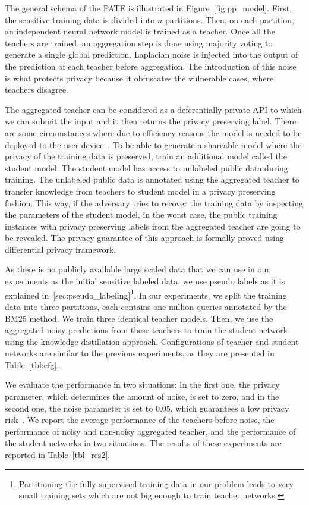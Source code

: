 The general schema of the PATE is illustrated in Figure~\ref{fig:pp_model}. First, the sensitive training data is divided into $n$ partitions. Then, on each partition, an independent neural network model is trained as a teacher.  Once all the teachers are trained, an aggregation step is done using majority voting to generate a single global prediction.  
Laplacian noise is injected into the output of the prediction of each teacher before aggregation. The introduction of this noise is what protects privacy because it obfuscates the vulnerable cases, where teachers disagree. 

The aggregated teacher can be considered as a deferentially private API to which we can submit the input and it then returns the privacy preserving label. There are some circumstances where due to efficiency reasons the model is needed to be deployed to the user device~\cite{Abadi:2016}. To be able to generate a shareable model where the privacy of the training data is preserved, \citet{Papernot:2017} train an additional model called the student model. The student model has access to unlabeled public data during training. The unlabeled public data is annotated using the aggregated teacher to transfer knowledge from teachers to student model in a privacy preserving fashion. 
This way, if the adversary tries to recover the training data by inspecting the parameters of the student model, in the worst case, the public training instances with privacy preserving labels from the aggregated teacher are going to be revealed.  The privacy guarantee of this approach is formally proved using differential privacy framework.

As there is no publicly available large scaled data that we can use in our experiments as the initial sensitive labeled data, we use pseudo labels as it is explained in~\ref{sec:pseudo_labeling}\footnote{Partitioning the fully supervised training data in our problem leads to very small training sets which are not big enough to train teacher networks.}. 
In our experiments, we split the training data into three partitions, each contains one million queries annotated by the BM25 method. We train three identical teacher models. Then, we use the aggregated noisy predictions from these teachers to train the student network using the knowledge distillation approach. Configurations of teacher and student networks are similar to the previous experiments, as they are presented in Table~\ref{tbl:cfg}.

We evaluate the performance in two situations: In the first one, the privacy parameter, which determines the amount of noise, is set to zero, and in the second one, the noise parameter is set to $0.05$, which guarantees a low privacy risk~\citep{Papernot:2017}.
%
We report the average performance of the teachers before noise, the performance of noisy and non-noisy aggregated teacher, and the performance of the student networks in two situations.  The results of these experiments are reported in Table~\ref{tbl_res2}.

